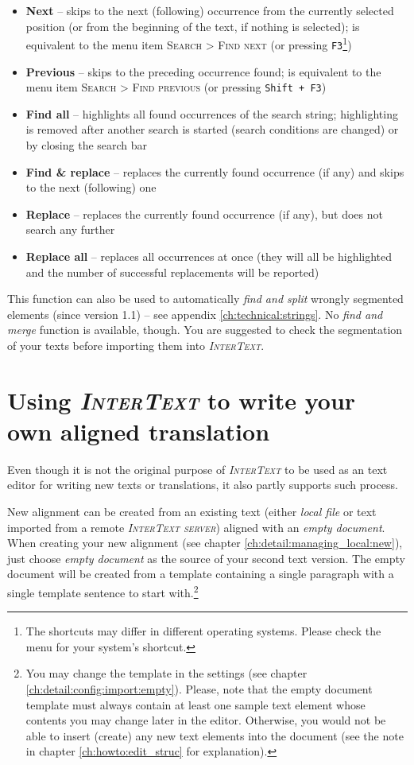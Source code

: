 \documentclass[a4paper,10pt,oneside]{book}
\newcommand{\IT}{\textit{\textsc{InterText}}\xspace}
\newcommand{\ITserver}{\textit{\textsc{InterText server}}\xspace}
\newcommand{\keys}[1]{\texttt{#1}}
\newcommand{\menu}[1]{\textsc{#1}}
\begin{document}
\begin{itemize}
 \item \textbf{Next} -- skips to the next (following) occurrence from the currently selected position (or from the beginning of the text, if nothing is selected); is equivalent to the menu item \menu{Search} > \menu{Find next} (or pressing \keys{F3}\footnote{The shortcuts may differ in different operating systems. Please check the menu for your system's shortcut.})
 \item \textbf{Previous} -- skips to the preceding occurrence found; is equivalent to the menu item \menu{Search} > \menu{Find previous} (or pressing \keys{Shift + F3})
 \item \textbf{Find all} -- highlights all found occurrences of the search string; highlighting is removed after another search is started (search conditions are changed) or by closing the search bar
 \item \textbf{Find \& replace} -- replaces the currently found occurrence (if any) and skips to the next (following) one
 \item \textbf{Replace} -- replaces the currently found occurrence (if any), but does not search any further
 \item \textbf{Replace all} -- replaces all occurrences at once (they will all be highlighted and the number of successful replacements will be reported)
\end{itemize}

This function can also be used to automatically \emph{find and split} wrongly segmented elements (since version 1.1) -- see appendix \ref{ch:technical:strings}. No \emph{find and merge} function is available, though. You are suggested to check the segmentation of your texts before importing them into \IT.

\chapter{Using \IT to write your own aligned translation}\label{ch:detail:translation}

Even though it is not the original purpose of \IT to be used as an text editor for writing new texts or translations, it also partly supports such process.

New alignment can be created from an existing text (either \emph{local file} or text imported from a remote \ITserver) aligned with an \emph{empty document}. When creating your new alignment (see chapter \ref{ch:detail:managing_local:new}), just choose \emph{empty document} as the source of your second text version. The empty document will be created from a template containing a single paragraph with a single template sentence to start with.\footnote{You may change the template in the settings (see chapter \ref{ch:detail:config:import:empty}). Please, note that the empty document template must always contain at least one sample text element whose contents you may change later in the editor. Otherwise, you would not be able to insert (create) any new text elements into the document (see the note in chapter \ref{ch:howto:edit_struc} for explanation).}
\end{document}
